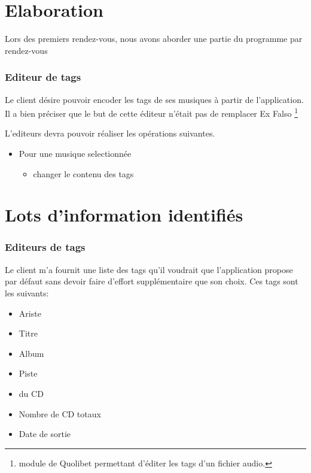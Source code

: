 \documentclass[a4paper,12pt]{report}
\begin{document}

\section{Elaboration}

Lors des premiers rendez-vous, nous avons aborder une partie du programme par rendez-vous

\subsubsection{Editeur de tags}

Le client désire pouvoir encoder les tags de ses musiques à partir de l'application. Il a bien préciser que le but de cette éditeur n'était pas de remplacer Ex Falso \footnote{module de Quolibet permettant d'éditer les tags d'un fichier audio.}

L'editeurs devra pouvoir réaliser les opérations suivantes.
\begin{itemize}
\item Pour une musique selectionnée
	\begin{itemize}
	\item changer le contenu des tags
	\end{itemize}
\end{itemize}

\section{Lots d'information identifiés}

\subsubsection{Editeurs de tags}

Le client m'a fournit une liste des tags qu'il voudrait que l'application propose par défaut sans devoir faire d'effort supplémentaire que son choix.
Ces tags sont les suivants:

\begin{itemize}
\item Ariste
\item Titre
\item Album
\item Piste
\item \No du CD
\item Nombre de CD totaux
\item Date de sortie
\end{itemize}
\end{document}
